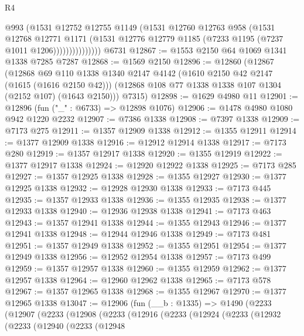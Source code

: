 \begin{lexlean}{R4}
\begin{coremodule}
                      @993
                      (@1531
                        @12752
                        @12755
                        @1149
                        (@1531
                          @12760
                          @12763
                          @958
                          (@1531
                            @12768
                            @12771
                            @1171
                            (@1531
                              @12776
                              @12779
                              @1185
                              (@7233 @1195 (@7237 @1011 @1206)))))))))))))))
    @6731
@12867 := @1553 @2150 @64 @1069 @1341 @1338 @7285 @7287
@12868 := @1569 @2150
@12896 := @12860
    (@12867
      (@12868
        @69
        @110
        @1338
        @1340
        @2147
        @4142
        (@1610 @2150 @42 @2147 (@1615 (@1616 @2150 @42)))
        (@12868 @108 @77 @1338 @1338 @107 @1304 (@2152 @107) (@1643 @2150)))
      @7315)
@12898 := @1629 @4980 @11
@12901 := @12896 (fun ("_" : @6733) => @12898 @1076)
@12906 := @1478 @4980 @1080 @942 @1220 @2232
@12907 := @7386 @1338
@12908 := @7397 @1338
@12909 := @7173 @275
@12911 := @1357 @12909 @1338
@12912 := @1355 @12911
@12914 := @1377 @12909 @1338
@12916 := @12912 @12914 @1338
@12917 := @7173 @280
@12919 := @1357 @12917 @1338
@12920 := @1355 @12919
@12922 := @1377 @12917 @1338
@12924 := @12920 @12922 @1338
@12925 := @7173 @285
@12927 := @1357 @12925 @1338
@12928 := @1355 @12927
@12930 := @1377 @12925 @1338
@12932 := @12928 @12930 @1338
@12933 := @7173 @445
@12935 := @1357 @12933 @1338
@12936 := @1355 @12935
@12938 := @1377 @12933 @1338
@12940 := @12936 @12938 @1338
@12941 := @7173 @463
@12943 := @1357 @12941 @1338
@12944 := @1355 @12943
@12946 := @1377 @12941 @1338
@12948 := @12944 @12946 @1338
@12949 := @7173 @481
@12951 := @1357 @12949 @1338
@12952 := @1355 @12951
@12954 := @1377 @12949 @1338
@12956 := @12952 @12954 @1338
@12957 := @7173 @499
@12959 := @1357 @12957 @1338
@12960 := @1355 @12959
@12962 := @1377 @12957 @1338
@12964 := @12960 @12962 @1338
@12965 := @7173 @578
@12967 := @1357 @12965 @1338
@12968 := @1355 @12967
@12970 := @1377 @12965 @1338
@13047 := @12906
    (fun (__b : @1335) =>
    @1490
      (@2233
        (@12907
          (@2233
            (@12908
              (@2233
                (@12916
                  (@2233
                    (@12924
                      (@2233
                        (@12932
                          (@2233
                            (@12940
                              (@2233
                                (@12948

\end{coremodule}
\end{lexlean}
